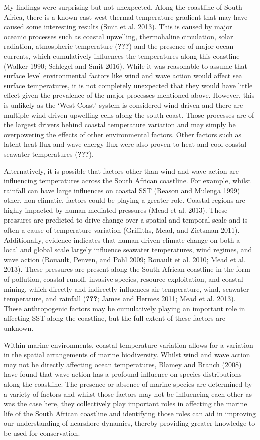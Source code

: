 \documentclass[12pt,a4paper,]{article}
\begin{document}
My findings were surprising but not unexpected. Along the coastline of
South Africa, there is a known east-west thermal temperature gradient
that may have caused some interesting results (Smit et al. 2013). This
is caused by major oceanic processes such as coastal upwelling,
thermohaline circulation, solar radiation, atmospheric temperature
({\textbf{???}}) and the presence of major ocean currents, which
cumulatively influences the temperatures along this coastline (Walker
1990; Schlegel and Smit 2016). While it was reasonable to assume that
surface level environmental factors like wind and wave action would
affect sea surface temperatures, it is not completely unexpected that
they would have little effect given the prevalence of the major
processes mentioned above. However, this is unlikely as the `West Coast'
system is considered wind driven and there are multiple wind driven
upwelling cells along the south coast. Those processes are of the
largest drivers behind coastal temperature variation and may simply be
overpowering the effects of other environmental factors. Other factors
such as latent heat flux and wave energy flux were also proven to heat
and cool coastal seawater temperatures ({\textbf{???}}).

Alternatively, it is possible that factors other than wind and wave
action are influencing temperatures across the South African coastline.
For example, whilst rainfall can have large influences on coastal SST
(Reason and Mulenga 1999) other, non-climatic, factors could be playing
a greater role. Coastal regions are highly impacted by human mediated
pressures (Mead et al. 2013). These pressures are predicted to drive
change over a spatial and temporal scale and is often a cause of
temperature variation (Griffiths, Mead, and Zietsman 2011).
Additionally, evidence indicates that human driven climate change on
both a local and global scale largely influence seawater temperatures,
wind regimes, and wave action (Rouault, Penven, and Pohl 2009; Rouault
et al. 2010; Mead et al. 2013). These pressures are present along the
South African coastline in the form of pollution, coastal runoff,
invasive species, resource exploitation, and coastal mining, which
directly and indirectly influences air temperature, wind, seawater
temperature, and rainfall ({\textbf{???}}; James and Hermes 2011; Mead
et al. 2013). These anthropogenic factors may be cumulatively playing an
important role in affecting SST along the coastline, but the full extent
of these factors are unknown.

Within marine environments, coastal temperature variation allows for a
variation in the spatial arrangements of marine biodiversity. Whilst
wind and wave action may not be directly affecting ocean temperatures,
Blamey and Branch (2008) have found that wave action has a profound
influence on species distributions along the coastline. The presence or
absence of marine species are determined by a variety of factors and
whilst those factors may not be influencing each other as was the case
here, they collectively play important roles in affecting the marine
life of the South African coastline and identifying those roles can aid
in improving our understanding of nearshore dynamics, thereby providing
greater knowledge to be used for conservation.
\end{document}

